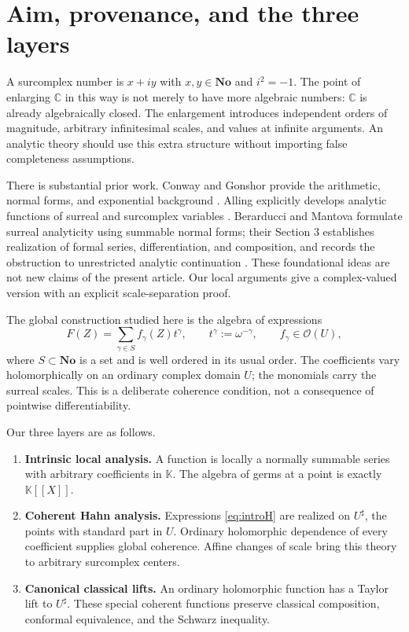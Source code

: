 \documentclass[11pt,letterpaper]{article}
\numberwithin{equation}{section}
\theoremstyle{definition}
\theoremstyle{remark}
\newcommand{\No}{\mathbf{No}}
\newcommand{\K}{\mathbb K}
\newcommand{\C}{\mathbb C}
\newcommand{\OO}{\mathcal O}
\begin{document}
\section{Aim, provenance, and the three layers}
\label{sec:aim}

A surcomplex number is $x+iy$ with $x,y\in\No$ and $i^2=-1$.
The point of enlarging $\C$ in this way is not merely to have more algebraic
numbers: $\C$ is already algebraically closed. The enlargement introduces
independent orders of magnitude, arbitrary infinitesimal scales, and values
at infinite arguments. An analytic theory should use this extra structure
without importing false completeness assumptions.

There is substantial prior work. Conway and Gonshor provide the arithmetic,
normal forms, and exponential background \cite{Conway,Gonshor}. Alling
explicitly develops analytic functions of surreal and surcomplex variables
\cite{Alling}. Berarducci and Mantova formulate surreal analyticity using
summable normal forms; their Section 3 establishes realization of formal
series, differentiation, and composition, and records the obstruction to
unrestricted analytic continuation \cite{BMgerms}. These foundational ideas
are not new claims of the present article. Our local arguments give a
complex-valued version with an explicit scale-separation proof.

The global construction studied here is the algebra of expressions
\begin{equation}\label{eq:introH}
 F(Z)=\sum_{\gamma\in S}f_\gamma(Z)t^\gamma,
 \qquad t^\gamma:=\omega^{-\gamma},\qquad f_\gamma\in\OO(U),
\end{equation}
where $S\subset\No$ is a set and is well ordered in its usual order.
The coefficients vary holomorphically on an ordinary complex domain $U$;
the monomials carry the surreal scales. This is a deliberate coherence
condition, not a consequence of pointwise differentiability.

Our three layers are as follows.
\begin{enumerate}[label=\textbf{\arabic*.},leftmargin=*]
\item \textbf{Intrinsic local analysis.} A function is locally a normally
summable series with arbitrary coefficients in $\K$. The algebra of germs
at a point is exactly $\K[[X]]$.
\item \textbf{Coherent Hahn analysis.} Expressions \eqref{eq:introH} are
realized on $U^\sharp$, the points with standard part in $U$. Ordinary
holomorphic dependence of every coefficient supplies global coherence.
Affine changes of scale bring this theory to arbitrary surcomplex centers.
\item \textbf{Canonical classical lifts.} An ordinary holomorphic function
has a Taylor lift to $U^\sharp$. These special coherent functions preserve
classical composition, conformal equivalence, and the Schwarz inequality.
\end{enumerate}
\end{document}
